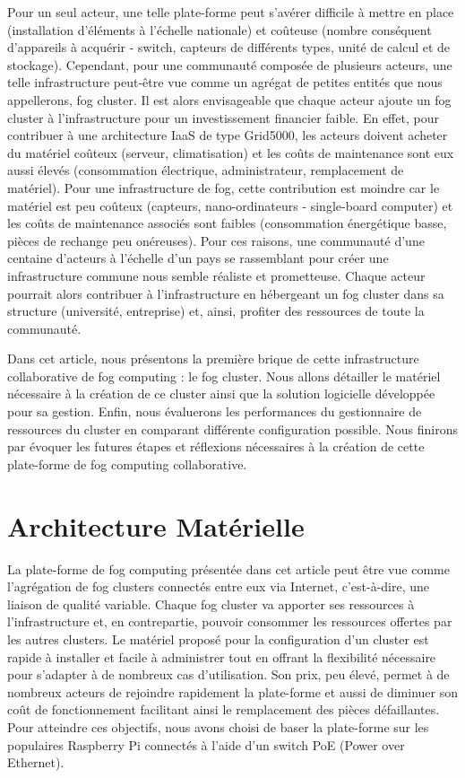 \documentclass[letterpaper, 10 pt, conference]{ieeeconf}
\begin{document}
Pour un seul acteur, une telle plate-forme peut s'avérer difficile à mettre en place (installation d'éléments à l'échelle nationale) et coûteuse (nombre conséquent d'appareils à acquérir - switch, capteurs de différents types, unité de calcul et de stockage). Cependant, pour une communauté composée de plusieurs acteurs, une telle infrastructure peut-être vue comme un agrégat de petites entités que nous appellerons, fog cluster. Il est alors envisageable que chaque acteur ajoute un fog cluster à l'infrastructure pour un investissement financier faible. En effet, pour contribuer à une architecture IaaS de type Grid5000, les acteurs doivent acheter du matériel coûteux (serveur, climatisation) et les coûts de maintenance sont eux aussi élevés (consommation électrique, administrateur, remplacement de matériel). Pour une infrastructure de fog, cette contribution est moindre car le matériel est peu coûteux (capteurs, nano-ordinateurs - single-board computer) et les coûts de maintenance associés sont faibles (consommation énergétique basse, pièces de rechange peu onéreuses). Pour ces raisons, une communauté d'une centaine d'acteurs à l'échelle d'un pays se rassemblant pour créer une infrastructure commune nous semble réaliste et prometteuse. Chaque acteur pourrait alors contribuer à l'infrastructure en hébergeant un fog cluster dans sa structure (université, entreprise) et, ainsi, profiter des ressources de toute la communauté. 

Dans cet article, nous présentons la première brique de cette infrastructure collaborative de fog computing : le fog cluster. Nous allons détailler le matériel nécessaire à la création de ce cluster ainsi que la solution logicielle développée pour sa gestion. Enfin, nous évaluerons les performances du gestionnaire de ressources du cluster en comparant différente configuration possible. Nous finirons par évoquer les futures étapes et réflexions nécessaires à la création de cette plate-forme de fog computing collaborative.

\section{Architecture Matérielle}
\label{sec:architecture}
La plate-forme de fog computing présentée dans cet article peut être vue comme l'agrégation de fog clusters connectés entre eux via Internet, c'est-à-dire, une liaison de qualité variable. Chaque fog cluster va apporter ses ressources à l'infrastructure et, en contrepartie, pouvoir consommer les ressources offertes par les autres clusters.
Le matériel proposé pour la configuration d'un cluster est rapide à installer et facile à administrer tout en offrant la flexibilité nécessaire pour s'adapter à de nombreux cas d'utilisation. Son prix, peu élevé, permet à de nombreux acteurs de rejoindre rapidement la plate-forme et aussi de diminuer son coût de fonctionnement facilitant ainsi le remplacement des pièces défaillantes. Pour atteindre ces objectifs, nous avons choisi de baser la plate-forme sur les populaires Raspberry Pi connectés à l'aide d'un switch PoE (Power over Ethernet).
\end{document}
